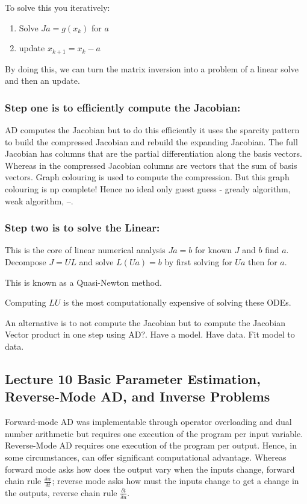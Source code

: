 To solve this you iteratively: 
\begin{enumerate}
\item Solve $Ja= g(x_k)$ for $a$
\item update $x_{k+1}= x_k -a$
\end{enumerate}
By doing this, we can turn the matrix inversion into a problem of a linear solve and then an update. 

\subsubsection{Step one is to efficiently compute the Jacobian:}
AD computes the Jacobian but to do this efficiently it uses the sparcity pattern to build the compressed  Jacobian and rebuild the expanding Jacobian.   The full Jacobian has columns that are the partial differentiation along the basis vectors. Whereas in the compressed Jacobian  columns are vectors that the sum of basis vectors. Graph colouring is used to compute the compression. But this graph colouring is np complete! Hence no ideal only guest guess - gready algorithm, weak algorithm, --.

\subsubsection{Step two is to solve the Linear:}
This is the core of linear numerical analysis  $Ja = b$ for known $J$  and $b$ find $a$.
Decompose $J=UL$  and solve $L(Ua) = b$ by first solving for $Ua$ then for $a$. 

This is known as a Quasi-Newton method. 

Computing $LU$ is the most computationally expensive of solving these ODEs.


An alternative is to not compute the Jacobian but to compute the Jacobian Vector product in  one step  using AD?. Have a model. Have data. Fit model to data.

\subsection{Lecture 10 Basic Parameter Estimation, Reverse-Mode AD, and Inverse Problems
}
Forward-mode AD was implementable through operator overloading and dual number arithmetic but requires one execution  of the program per input variable. Reverse-Mode AD requires one execution  of the program per output. Hence, in some circumstances, can offer significant computational advantage. Whereas forward mode asks how does the output vary when the inputs change, forward chain rule $\frac{\delta w}{\delta t}$; reverse mode asks how must the inputs change to get a change in the outputs, reverse chain rule $\frac{\delta t}{\delta u}$.


